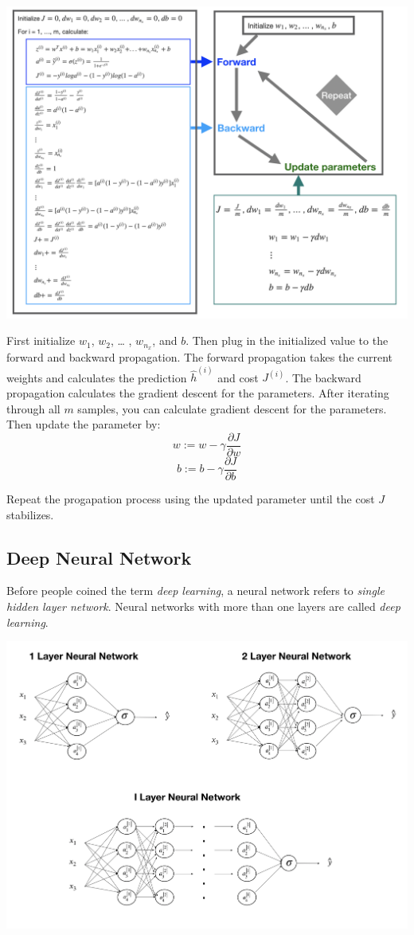\documentclass[12pt,]{krantz}
\begin{document}
\includegraphics[width=1\textwidth,height=\textheight]{images/GradientDescent.png}

First initialize \(w_1\), \(w_2\), \ldots{} , \(w_{n_x}\), and \(b\). Then plug in the initialized value to the forward and backward propagation. The forward propagation takes the current weights and calculates the prediction \(\hat{h}^{(i)}\) and cost \(J^{(i)}\). The backward propagation calculates the gradient descent for the parameters. After iterating through all \(m\) samples, you can calculate gradient descent for the parameters. Then update the parameter by:
\[w := w - \gamma \frac{\partial J}{\partial w}\]
\[b := b - \gamma \frac{\partial J}{\partial b}\]

Repeat the progapation process using the updated parameter until the cost \(J\) stabilizes.

\hypertarget{deep-neural-network}{%
\subsection{Deep Neural Network}\label{deep-neural-network}}

Before people coined the term \emph{deep learning}, a neural network refers to \emph{single hidden layer network}. Neural networks with more than one layers are called \emph{deep learning}.

\includegraphics{images/dnn_str.png}
\end{document}
